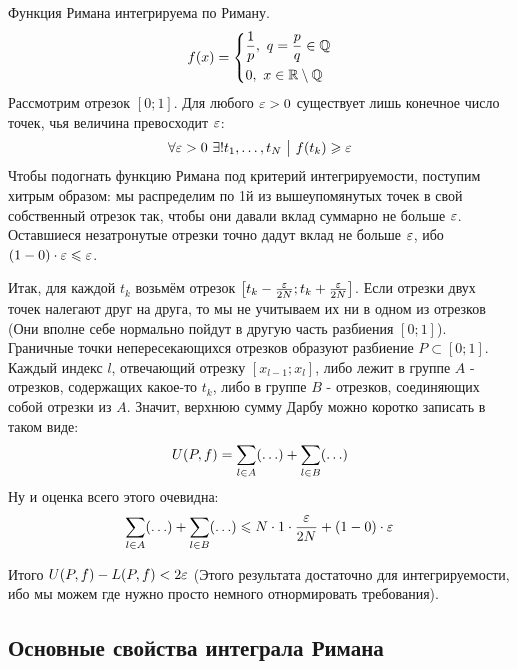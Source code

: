 \begin{example}
	Функция Римана интегрируема по Риману.
		\[
	f(x) = \left\{\begin{aligned}
		&\frac{1}{p},\ q = \frac{p}{q} \in\mathbb{Q}
		\\
		&0,\ x\in \mathbb{R} \setminus \mathbb{Q}
	\end{aligned}\right.
	\]
	Рассмотрим отрезок $[0;1]$. Для любого $\varepsilon > 0$ существует лишь конечное число точек, чья величина превосходит $\varepsilon$:
	\[
		\forall \varepsilon > 0\ \exists! t_1, \ldots, t_N \ \big|\  f(t_k) \geqslant \varepsilon
	\]
	Чтобы подогнать функцию Римана под критерий интегрируемости, поступим хитрым образом: мы распределим по 1й из вышеупомянутых точек в свой собственный отрезок так, чтобы они давали вклад суммарно не больше $\varepsilon$. Оставшиеся незатронутые отрезки точно дадут вклад не больше $\varepsilon$, ибо $(1 - 0) \cdot \varepsilon \leqslant \varepsilon$.
	
	Итак, для каждой $t_k$ возьмём отрезок $\left[t_k - \frac{\varepsilon}{2N}; t_k + \frac{\varepsilon}{2N}\right]$. Если отрезки двух точек налегают друг на друга, то мы не учитываем их ни в одном из отрезков (Они вполне себе нормально пойдут в другую часть разбиения $[0; 1]$). Граничные точки непересекающихся отрезков образуют разбиение $P \subset [0; 1]$. Каждый индекс $l$, отвечающий отрезку $[x_{l - 1}; x_l]$, либо лежит в группе $A$ - отрезков, содержащих какое-то $t_k$, либо в группе $B$ - отрезков, соединяющих собой отрезки из $A$. Значит, верхнюю сумму Дарбу можно коротко записать в таком виде:
	\[
		U(P, f) = \sum\limits_{l \in A} (\ldots) + \sum\limits_{l \in B} (\ldots)
	\]
	Ну и оценка всего этого очевидна:
	\[
		\sum\limits_{l \in A} (\ldots) + \sum\limits_{l \in B} (\ldots) \leqslant N \cdot 1 \cdot \frac{\varepsilon}{2N} + (1 - 0) \cdot \varepsilon
	\]
	
	Итого $U(P, f) - L(P, f) < 2\varepsilon$ (Этого результата достаточно для интегрируемости, ибо мы можем где нужно просто немного отнормировать требования).
\end{example}

\subsection{Основные свойства интеграла Римана}

